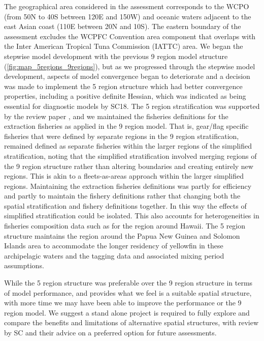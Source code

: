 The geographical area considered in the assessment corresponds to the WCPO (from 50\degree{}N to 40\degree{}S between 120\degree{}E and 150\degree{}W) and oceanic waters adjacent to the east Asian coast (110\degree{}E between 20\degree{}N and 10\degree{}S). The eastern boundary of the assessment excludes the WCPFC Convention area component that overlaps with the Inter American Tropical Tuna Commission (IATTC) area. We began the stepwise model development with the previous 9 region model structure \citep{vincent_stock_2020}(\autoref{fig:map_5regions_9regions}), but as we progressed through the stepwise model development, aspects of model convergence began to deteriorate and a decision was made to implement the 5 region structure which had better convergence properties, including a positive definite Hessian, which was indicated as being essential for diagnostic models by SC18. The 5 region stratification was supported by the review paper \citep{hamer_review_2023}, and we maintained the fisheries definitions for the extraction fisheries as applied in the 9 region model. That is, gear/flag specific fisheries that were defined by separate regions in the 9 region stratification, remained defined as separate fisheries within the larger regions of the simplified stratification, noting that the simplified stratification involved merging regions of the 9 region structure rather than altering boundaries and creating entirely new regions. This is akin to a fleets-as-areas approach within the larger simplified regions. Maintaining the extraction fisheries definitions was partly for efficiency and partly to maintain the fishery definitions rather that changing both the spatial stratification and fishery definitions together. In this way the effects of simplified stratification could be isolated. This also accounts for heterogeneities in fisheries composition data such as for the region around Hawaii. The 5 region structure maintains the region around the Papua New Guinea and Solomon Islands area to accommodate the longer residency of yellowfin in these archipelagic waters and the tagging data and associated mixing period assumptions.

While the 5 region structure was preferable over the 9 region structure in terms of model performance, and provides what we feel is a suitable spatial structure, with more time we may have been able to improve the performance or the 9 region model. We suggest a stand alone project is required to fully explore and compare the benefits and limitations of alternative spatial structures, with review by SC and their advice on a preferred option for future assessments.


